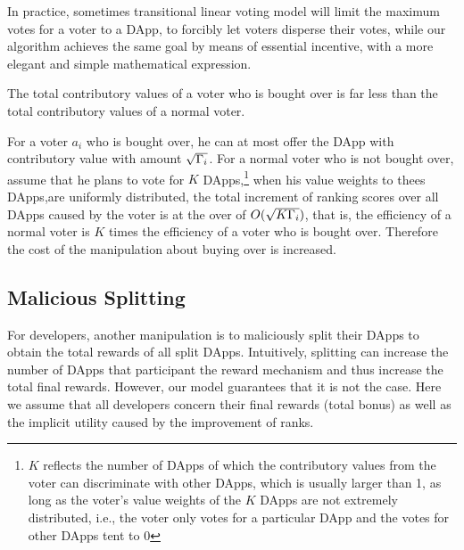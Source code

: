 In practice, sometimes transitional  linear voting model will limit the maximum votes for a voter to a DApp, to forcibly let voters disperse their votes, while our algorithm achieves the same goal by  means of essential incentive,  with a more elegant and simple mathematical expression.

\begin{corollary}
	The total contributory values of a  voter who is bought over is far less than the total contributory values of a normal voter.
\end{corollary}
For a voter $a_i$ who is bought over, he can at most offer the DApp with contributory value with amount $\sqrt{\Gamma_i}$. For a normal voter who is not bought over, assume that he plans to vote for $K$ DApps,\footnote{$K$ reflects the number of DApps of which the contributory values from the voter can discriminate with other DApps, which is usually larger than 1, as long as the voter's value weights of the $K$ DApps are not extremely distributed, i.e., the voter only votes for a particular DApp and the votes for other DApps tent to 0} when  his value weights to thees DApps,are uniformly distributed, the total increment of ranking scores  over all DApps caused by the voter is at the over of $O(\sqrt{K\Gamma_i})$, that is, the efficiency of a normal voter is $K$ times the efficiency of a voter who is bought over. Therefore the cost of the manipulation about buying over is increased.

\subsection{Malicious Splitting}
\label{subsec:5.2}
For developers, another manipulation is to maliciously split their DApps  to obtain the total rewards of all split DApps. Intuitively, splitting can increase the number of DApps that participant the reward mechanism and thus increase the total final rewards. However, our model guarantees that it is not the case. Here we assume that all developers concern their final rewards (total bonus) as well as the implicit utility caused by the improvement of ranks.

